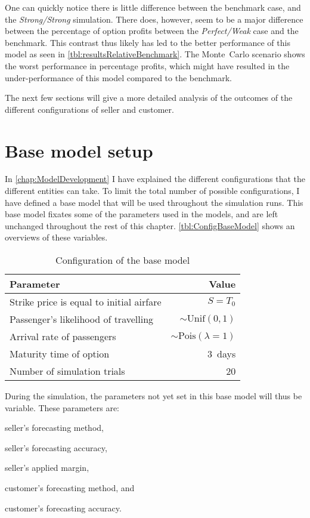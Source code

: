 One can quickly notice there is little difference between the benchmark case, and the \emph{Strong/Strong} simulation. There does, however, seem to be a major difference between the percentage of option profits between the \emph{Perfect/Weak} case and the benchmark. This contrast thus likely has led to the better performance of this model as seen in \autoref{tbl:resultsRelativeBenchmark}. The Monte~Carlo scenario shows the worst performance in percentage profits, which might have resulted in the under-performance of this model compared to the benchmark.

The next few sections will give a more detailed analysis of the outcomes of the different configurations of seller and customer.



\section{Base model setup}
In \autoref{chap:ModelDevelopment} I have explained the different configurations that the different entities can take. To limit the total number of possible configurations, I have defined a base model that will be used throughout the simulation runs. This base model fixates some of the parameters used in the models, and are left unchanged throughout the rest of this chapter. \autoref{tbl:ConfigBaseModel} shows an overviews of these variables.

\begin{table} \centering
    \begin{tabular}{l  r}
    \toprule
    Parameter      &  Value \\
    \midrule
    Strike price is equal to initial airfare  &  $S = T_0$ \\
    Passenger's likelihood of travelling  &  $\sim \mbox{Unif}(0, 1)$  \\
    Arrival rate of passengers   &  $\sim \mbox{Pois}(\lambda=1)$ \\
    Maturity time of option      &  3~days \\
    Number of simulation trials  &  20 \\
    \bottomrule
    \end{tabular}
    \caption{Configuration of the base model}
    \label{tbl:ConfigBaseModel}
\end{table}
During the simulation, the parameters not yet set in this base model will thus be variable. These parameters are:


\begin{compactitem}
    \item seller's forecasting method,
    \item seller's forecasting accuracy,
    \item seller's applied margin,
    \item customer's forecasting method, and
    \item customer's forecasting accuracy.
\end{compactitem}

